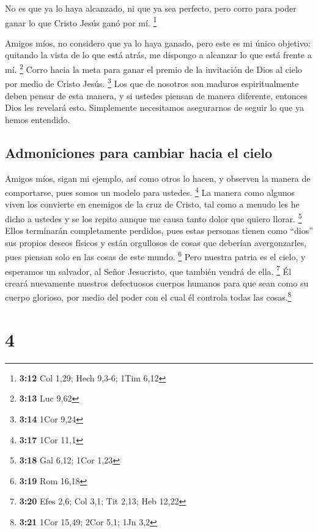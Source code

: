  No es que ya lo haya alcanzado, ni que ya sea perfecto,
pero corro para poder ganar lo que Cristo Jesús ganó por mí. \footnote{\textbf{3:12}
  Col 1,29; Hech 9,3-6; 1Tim 6,12}

 Amigos míos, no considero que ya lo haya ganado, pero
este es mi único objetivo: quitando la vista de lo que está atrás, me
dispongo a alcanzar lo que está frente a mí. \footnote{\textbf{3:13} Luc
  9,62}  Corro hacia la meta para ganar el premio de la
invitación de Dios al cielo por medio de Cristo Jesús. \footnote{\textbf{3:14}
  1Cor 9,24}  Los que de nosotros son maduros
espiritualmente deben pensar de esta manera, y si ustedes piensan de
manera diferente, entonces Dios les revelará esto. 
Simplemente necesitamos asegurarnos de seguir lo que ya hemos entendido.

\hypertarget{admoniciones-para-cambiar-hacia-el-cielo}{%
\subsection{Admoniciones para cambiar hacia el
cielo}\label{admoniciones-para-cambiar-hacia-el-cielo}}

 Amigos míos, sigan mi ejemplo, así como otros lo hacen,
y observen la manera de comportarse, pues somos un modelo para ustedes.
\footnote{\textbf{3:17} 1Cor 11,1}  La manera como
algunos viven los convierte en enemigos de la cruz de Cristo, tal como a
menudo les he dicho a ustedes y se los repito aunque me causa tanto
dolor que quiero llorar. \footnote{\textbf{3:18} Gal 6,12; 1Cor 1,23}
 Ellos terminarán completamente perdidos, pues estas
personas tienen como ``dios'' sus propios deseos físicos y están
orgullosos de cosas que deberían avergonzarles, pues piensan solo en las
cosas de este mundo. \footnote{\textbf{3:19} Rom 16,18} 
Pero nuestra patria es el cielo, y esperamos un salvador, al Señor
Jesucristo, que también vendrá de ella. \footnote{\textbf{3:20} Efes
  2,6; Col 3,1; Tit 2,13; Heb 12,22}  Él creará
nuevamente nuestros defectuosos cuerpos humanos para que sean como su
cuerpo glorioso, por medio del poder con el cual él controla todas las
cosas.\footnote{\textbf{3:21} 1Cor 15,49; 2Cor 5,1; 1Jn 3,2}

\hypertarget{section-3}{%
\section{4}\label{section-3}}

